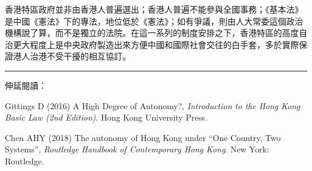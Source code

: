 香港特區政府並非由香港人普遍選出；香港人普遍不能參與全國事務；《基本法》是中國《憲法》下的專法，地位低於《憲法》；如有爭議，則由人大常委這個政治機構說了算，而不是獨立的法院。在這一系列的制度安排之下，香港特區的高度自治更大程度上是中央政府製造出來方便中國和國際社會交往的白手套，多於實際保證港人治港不受干擾的相互協訂。

\rule[-10pt]{15cm}{0.05em}

伸延閱讀：

Gittings D (2016) A High Degree of Autonomy?, \textit{Introduction to the Hong Kong Basic Law (2nd Edition)}. Hong Kong University Press.

Chen AHY (2018) The autonomy of Hong Kong under “One Country, Two Systems”, \textit{Routledge Handbook of Contemporary Hong Kong}. New York: Routledge.